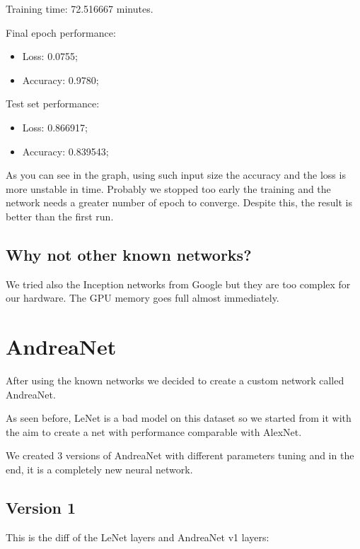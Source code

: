 \documentclass[paper=a4, fontsize=11pt]{scrartcl} %
\numberwithin{equation}{section} %
\numberwithin{figure}{section} %
\numberwithin{table}{section} %
\begin{document}
Training time: 72.516667 minutes.

Final epoch performance:
\begin{itemize}
    \item Loss: 0.0755;
    \item Accuracy: 0.9780;
\end{itemize}

Test set performance:
\begin{itemize}
    \item Loss: 0.866917;
    \item Accuracy: 0.839543;
\end{itemize}

As you can see in the graph, using such input size the accuracy and the loss is more unstable in time.
Probably we stopped too early the training and the network needs a greater number of epoch to converge.
Despite this, the result is better than the first run.

\subsection*{Why not other known networks?}

We tried also the Inception networks from Google but they are too complex for our hardware.
The GPU memory goes full almost immediately.

\section*{AndreaNet}

After using the known networks we decided to create a custom network called AndreaNet.

As seen before, LeNet is a bad model on this dataset so we started from it with the aim to create a net with performance comparable with AlexNet.

We created 3 versions of AndreaNet with different parameters tuning and in the end, it is a completely new neural network.

\subsection*{Version 1}

This is the diff of the LeNet layers and AndreaNet v1 layers:
\end{document}
